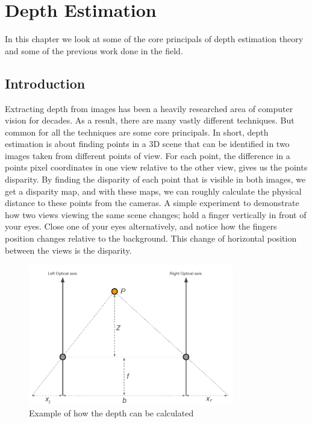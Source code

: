 \chapter{Depth Estimation}
\label{chap:depthestimation_theory}


In this chapter we look at some of the core principals of depth
estimation theory and some of the previous work done in the field.

\section{Introduction}

Extracting depth from images has been a heavily researched area of computer
vision for decades. As a result, there are many vastly different techniques.
But common for all the techniques are some core principals. In short, depth
estimation is about finding points in a 3D scene that can be identified in two
images taken from different points of view. For each point, the difference in
a points pixel coordinates in one view relative to the other view, gives us
the points disparity. By finding the disparity of each point that is visible
in both images, we get a disparity map, and with these maps, we can roughly
calculate the physical distance to these points from the cameras. A simple
experiment to demonstrate how two views viewing the same scene changes; hold a
finger vertically in front of your eyes. Close one of your eyes alternatively,
and notice how the fingers position changes relative to the background. This
change of horizontal position between the views is the disparity.

\begin{figure}
  \centering
  \label{fig:depth-theory}
  \includegraphics[width=0.8\textwidth]{images/depth-estimation-theory.pdf}
  \caption{Example of how the depth can be calculated}
\end{figure}


